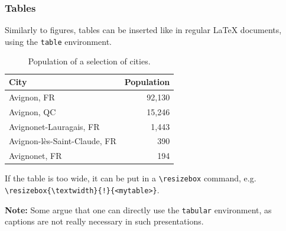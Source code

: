 \documentclass[10pt,    %
    english,            %
    xcolor=table,       %
    envcountsect,       %
    aspectratio=43      %
]{beamer}
\begin{document}
\begin{frame}
    \frametitle{Tables}

    Similarly to figures, tables can be inserted like in regular \LaTeX{} documents, using the \texttt{table} environment.

    \begin{table}[H]
        \centering
        \begin{tabular}{l r}
            \hline
	        \rowcolor{fgLightRed} 
            \textbf{City} & \textbf{Population} \\
            \hline
            Avignon, FR & 92,130 \\
            Avignon, QC & 15,246 \\
            Avignonet-Lauragais, FR & 1,443 \\
            Avignon-lès-Saint-Claude, FR & 390 \\
            Avignonet, FR & 194 \\
            \hline
        \end{tabular}
        \caption{Population of a selection of cities.}
        \label{tab:population}
    \end{table}
    
    If the table is too wide, it can be put in a \texttt{\textbackslash{}resizebox} command, e.g. \texttt{\textbackslash{}resizebox\{\textbackslash{}textwidth\}\{!\}\{<mytable>\}}.
    
    
    
    
    
    \medskip
    \textbf{Note:} Some argue that one can directly use the \texttt{tabular} environment, as captions are not really necessary in such presentations.
\end{frame}
    
\end{document}
